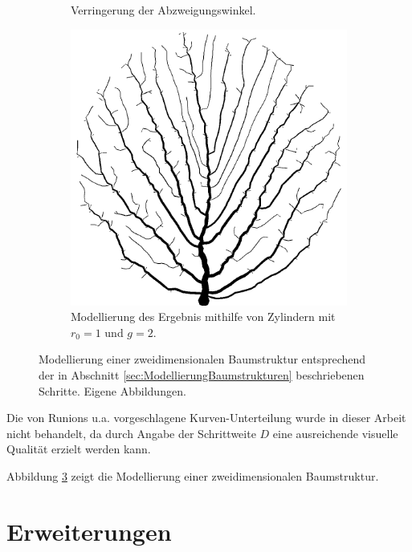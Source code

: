 \begin{figure} [hbtp]
\begin{subfigure}[t]{.35\textwidth}
		\caption{Verringerung der Abzweigungswinkel.}
		\label{subfig:SCA_Extended3}
	\end{subfigure}
	\hspace{.1\textwidth}
	\begin{subfigure}[t]{.35\textwidth}
		\centering
		\includegraphics[width=\linewidth]{images/SCA_Extended4.png}
		\caption{Modellierung des Ergebnis mithilfe von Zylindern mit $r_0 = 1$ und $g=2$.}
		\label{subfig:SCA_Extended4}
	\end{subfigure}
	\caption{Modellierung einer zweidimensionalen Baumstruktur entsprechend der in Abschnitt \ref{sec:ModellierungBaumstrukturen} beschriebenen Schritte. Eigene Abbildungen.}
	\label{fig:SCA_Extended}
\end{figure}

Die von Runions u.a. \cite{SpaceColonizationAlgorithm:07} vorgeschlagene Kurven-Unterteilung \cite[Abschn. 2]{SpaceColonizationAlgorithm:07} wurde in dieser Arbeit nicht behandelt, da durch Angabe der Schrittweite $D$ eine ausreichende visuelle Qualität erzielt werden kann.

Abbildung \ref{fig:SCA_Extended} zeigt die Modellierung einer zweidimensionalen Baumstruktur.

\section{Erweiterungen}

